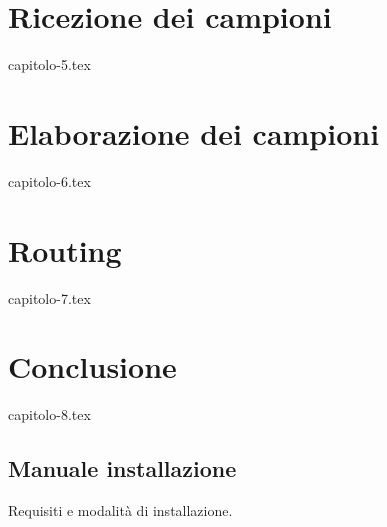 \documentclass[a4paper, 12pt, twoside, openright]{book}
\begin{document}
\chapter{Ricezione dei campioni} %
\thispagestyle{empty}
{capitolo-5.tex}

\chapter{Elaborazione dei campioni} %
\thispagestyle{empty}
{capitolo-6.tex}

\chapter{Routing} %
\thispagestyle{empty}
{capitolo-7.tex}

\chapter{Conclusione} %
\thispagestyle{empty}
{capitolo-8.tex}

\begin{appendices}
\chapter{Manuale installazione} %
Requisiti e modalità di installazione.
\end{appendices}

\backmatter

\begingroup %
  \makeatletter
  \let\ps@plain\ps@empty
  \makeatother
  \printbibliography[
    heading=bibintoc,
    title={Bibliografia} ]
\endgroup
\end{document}
